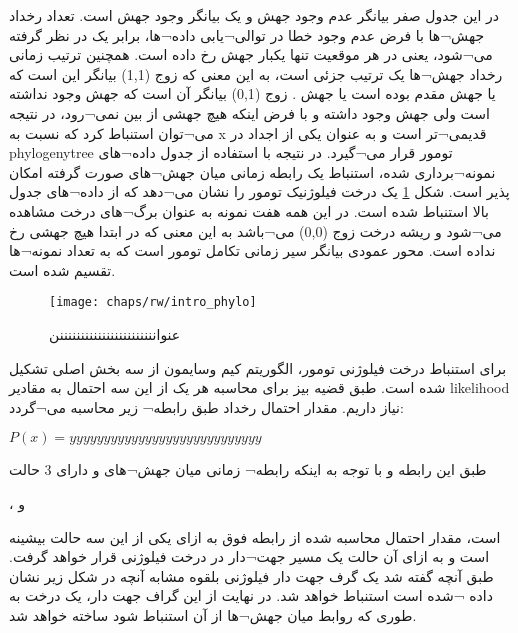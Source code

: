 در این جدول صفر بیانگر عدم وجود جهش و یک بیانگر وجود جهش است. تعداد رخداد جهش¬ها با فرض عدم وجود خطا در توالی¬یابی داده¬ها، برابر یک در نظر گرفته می¬شود، یعنی در هر موقعیت تنها یکبار جهش رخ داده است. همچنین ترتیب زمانی رخداد جهش¬ها یک ترتیب جزئی است، به این معنی که زوج (1,1) بیانگر این است که یا جهش  مقدم بوده است یا جهش . زوج (0,1) بیانگر آن است که جهش  وجود نداشته است ولی جهش  وجود داشته و با فرض اینکه هیچ جهشی از بین نمی¬رود، در نتیجه می¬توان استنباط کرد که  نسبت به x قدیمی¬تر است و به عنوان یکی از اجداد  در \gls{phylogenytree} تومور قرار می¬گیرد. در نتیجه با استفاده از جدول داده¬های نمونه¬برداری شده، استنباط یک رابطه زمانی میان جهش¬های صورت گرفته امکان پذیر است. شکل \ref{fig:ch_rw:intro_phylo} یک درخت فیلوژنیک تومور را نشان می¬دهد که از داده¬های جدول بالا استنباط شده است. در این همه هفت نمونه به عنوان برگ¬های درخت مشاهده می¬شود و ریشه درخت زوج (0,0) می¬باشد به این معنی که در ابتدا هیچ جهشی رخ نداده است. محور عمودی بیانگر سیر زمانی تکامل تومور است که به تعداد نمونه¬ها تقسیم شده است. 


\begin{figure}[!ht]
	\centerline{\texttt{[image: chaps/rw/intro\_phylo]}}
	\caption{عنوانننننننننننننننننننننننن}
	\label{fig:ch_rw:intro_phylo}
\end{figure}

برای استنباط درخت فیلوژنی تومور، الگوریتم کیم وسایمون از سه بخش اصلی تشکیل شده است. طبق قضیه بیز برای محاسبه هر یک از این سه احتمال به مقادیر \gls{likelihood}  نیاز داریم. مقدار احتمال رخداد طبق رابطه¬ زیر محاسبه می¬گردد:

\begin{center}
	\begin{math}
		P(x) = yyyyyyyyyyyyyyyyyyyyyyyyyyyy
	\end{math}
\end{center}

طبق این رابطه و با توجه به اینکه رابطه¬ زمانی میان جهش¬های  و  دارای 3 حالت 
\begin{center}
	 ،   و  
\end{center}
است، مقدار احتمال محاسبه شده از رابطه فوق به ازای یکی از این سه حالت بیشینه است و به ازای آن حالت یک مسیر جهت¬دار در درخت فیلوژنی قرار خواهد گرفت. طبق آنچه گفته شد یک گرف جهت دار فیلوژنی بلقوه مشابه آنچه در شکل زیر نشان داده ¬شده است استنباط خواهد شد. در نهایت از این گراف جهت دار، یک درخت به طوری که روابط میان جهش¬ها از آن استنباط شود ساخته خواهد شد. 

